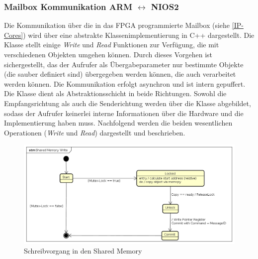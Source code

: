 
\subsubsection{Mailbox Kommunikation ARM $\leftrightarrow$ NIOS2}
Die Kommunikation über die in das \ac{FPGA} programmierte Mailbox (siehe \ref{IP-Cores}) wird über eine abstrakte Klassenimplementierung in C++ dargestellt. 
Die Klasse stellt einige \textit{Write} und \textit{Read} Funktionen zur Verfügung, die mit verschiedenen Objekten umgehen können. Durch dieses Vorgehen ist sichergestellt, das der Aufrufer als Übergabeparameter nur bestimmte Objekte (die sauber definiert sind) übergegeben werden können, die auch verarbeitet werden können. Die Kommunikation erfolgt asynchron und ist intern gepuffert. Die Klasse dient als Abstraktionsschicht in beide Richtungen. Sowohl die Empfangsrichtung als auch die Senderichtung werden über die Klasse abgebildet, sodass der Aufrufer keinerlei interne Informationen über die Hardware und die Implementierung haben muss.
Nachfolgend werden die beiden wesentlichen Operationen (\textit{Write} und \textit{Read}) dargestellt und beschrieben.

\begin{figure}
	\includegraphics[width=\textwidth]{Abb/Shared_mem_Write.png}
	\caption{Schreibvorgang in den Shared Memory}
	\label{Software:Arm:SharedMemWrite}
\end{figure}

